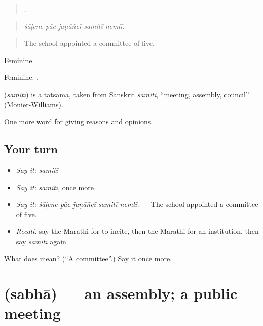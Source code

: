\begin{quote}
    .
\end{quote}

\begin{quote}
\emph{śāḷene pāc jaṇāñcī samitī nemlī.}
\end{quote}

\begin{quote}
The school appointed a committee of five.
\end{quote}

Feminine.

Feminine:  .

\begin{cousinweb}
\textbf{} (\emph{samitī}) is a tatsama, taken from Sanskrit \emph{samiti}, \textquotedblleft{}meeting, assembly, council\textquotedblright{} (Monier-Williams).
\end{cousinweb}

\begin{grammarlens}[title={What you've built}]
One more word for giving reasons and opinions.
\end{grammarlens}

\subsection*{Your turn}
\begin{itemize}
\raggedright
  \item \emph{Say it:} \emph{samitī}
  \item \emph{Say it:} \emph{samitī}, once more
  \item \emph{Say it:} \emph{śāḷene pāc jaṇāñcī samitī nemlī.} — The school appointed a committee of five.
  \item \emph{Recall:} say the Marathi for to incite, then the Marathi for an institution, then say \emph{samitī} again
\end{itemize}

\begin{tcolorbox}[breakable,colback=teal!4,colframe=teal!35!black,title={Before you move on}]
What does  mean? (\textquotedblleft{}A committee\textquotedblright{}.) Say it once more.
\end{tcolorbox}
\section[\texorpdfstring{\mr{सभा} (sabhā)}{सभा (sabhā)}]{ (sabhā) — an assembly; a public meeting}

